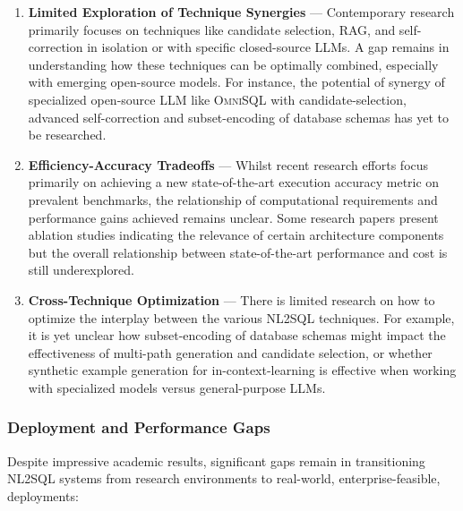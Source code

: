 \documentclass{article}
\begin{document}
\begin{enumerate}
    \item \textbf{Limited Exploration of Technique Synergies} — Contemporary research primarily focuses on techniques like
          candidate selection, RAG, and self-correction in isolation or with specific closed-source LLMs. A gap remains
          in understanding how these techniques can be optimally combined, especially with emerging open-source models.
          For instance, the potential of synergy of specialized open-source LLM like \textsc{OmniSQL} with candidate-selection,
          advanced self-correction and subset-encoding of database schemas has yet to be researched.
    \item \textbf{Efficiency-Accuracy Tradeoffs} — Whilst recent research efforts focus primarily on achieving a new
          state-of-the-art execution accuracy metric on prevalent benchmarks, the relationship of computational requirements and
          performance gains achieved remains unclear. Some research papers present ablation studies indicating the relevance
          of certain architecture components but the overall relationship between state-of-the-art performance and cost
          is still underexplored. 
     \item \textbf{Cross-Technique Optimization} — There is limited research on how to optimize the interplay between the various
          NL2SQL techniques. For example, it is yet unclear how subset-encoding of database schemas might impact the effectiveness
          of multi-path generation and candidate selection, or whether synthetic example generation for in-context-learning is 
          effective when working with specialized models versus general-purpose LLMs.
\end{enumerate}

\subsubsection{Deployment and Performance Gaps}

Despite impressive academic results, significant gaps remain in transitioning NL2SQL systems from research environments
to real-world, enterprise-feasible, deployments:
\end{document}
